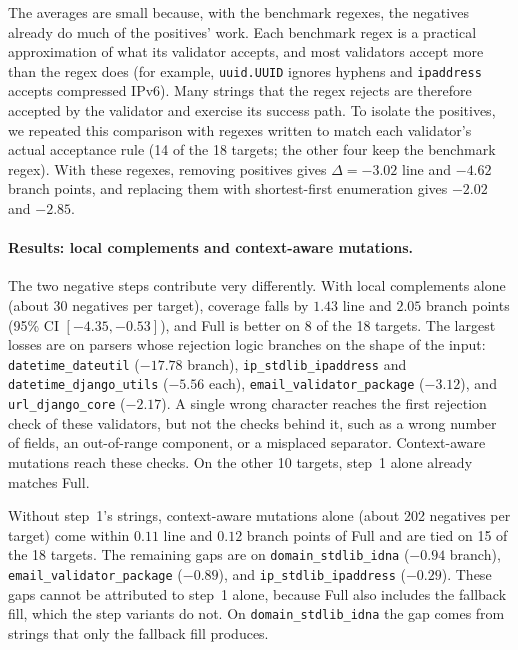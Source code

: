 The averages are small because, with the benchmark regexes, the negatives already
do much of the positives' work. Each benchmark regex is a practical approximation
of what its validator accepts, and most validators accept more than the regex
does (for example, \texttt{uuid.UUID} ignores hyphens and \texttt{ipaddress}
accepts compressed IPv6). Many strings that the regex rejects are therefore
accepted by the validator and exercise its success path. To isolate the
positives, we repeated this comparison with regexes written to match each
validator's actual acceptance rule (14 of the 18 targets; the other four keep the
benchmark regex). With these regexes, removing positives gives $\Delta = -3.02$ line and
$-4.62$ branch points, and replacing them with shortest-first enumeration gives
$-2.02$ and $-2.85$.

\paragraph{Results: local complements and context-aware mutations.}
The two negative steps contribute very differently. With local complements alone
(about 30 negatives per target), coverage falls by $1.43$ line and $2.05$ branch
points (95\% CI $[-4.35, -0.53]$), and Full is better on 8 of the 18 targets. The
largest losses are on parsers whose rejection logic branches on the shape of the
input: \texttt{datetime\_dateutil} ($-17.78$ branch), \texttt{ip\_stdlib\_ipaddress}
and \texttt{datetime\_django\_utils} ($-5.56$ each), \texttt{email\_validator\_package}
($-3.12$), and \texttt{url\_django\_core} ($-2.17$). A single wrong character
reaches the first rejection check of these validators, but not the checks behind
it, such as a wrong number of fields, an out-of-range component, or a misplaced
separator. Context-aware mutations reach these checks. On the other 10 targets,
step~1 alone already matches Full.

Without step~1's strings, context-aware mutations alone (about 202 negatives per
target) come within $0.11$ line and $0.12$ branch points of Full and are tied on
15 of the 18 targets. The remaining gaps are on \texttt{domain\_stdlib\_idna}
($-0.94$ branch), \texttt{email\_validator\_package} ($-0.89$), and
\texttt{ip\_stdlib\_ipaddress} ($-0.29$). These gaps cannot be attributed to step~1
alone, because Full also includes the fallback fill, which the step variants do
not. On \texttt{domain\_stdlib\_idna} the gap comes from strings that only the
fallback fill produces.

